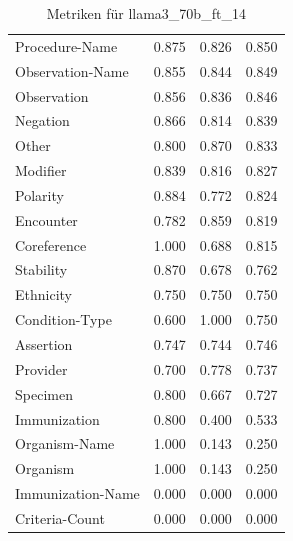 \begin{table}[htbp]
\begin{tabular}{p{5cm}ccc}
Procedure-Name & 0.875 & 0.826 & 0.850 \\
Observation-Name & 0.855 & 0.844 & 0.849 \\
Observation & 0.856 & 0.836 & 0.846 \\
Negation & 0.866 & 0.814 & 0.839 \\
Other & 0.800 & 0.870 & 0.833 \\
Modifier & 0.839 & 0.816 & 0.827 \\
Polarity & 0.884 & 0.772 & 0.824 \\
Encounter & 0.782 & 0.859 & 0.819 \\
Coreference & 1.000 & 0.688 & 0.815 \\
Stability & 0.870 & 0.678 & 0.762 \\
Ethnicity & 0.750 & 0.750 & 0.750 \\
Condition-Type & 0.600 & 1.000 & 0.750 \\
Assertion & 0.747 & 0.744 & 0.746 \\
Provider & 0.700 & 0.778 & 0.737 \\
Specimen & 0.800 & 0.667 & 0.727 \\
Immunization & 0.800 & 0.400 & 0.533 \\
Organism-Name & 1.000 & 0.143 & 0.250 \\
Organism & 1.000 & 0.143 & 0.250 \\
Immunization-Name & 0.000 & 0.000 & 0.000 \\
Criteria-Count & 0.000 & 0.000 & 0.000 \\
\bottomrule
\end{tabular}
\caption{Metriken für llama3_70b_ft_14}
\label{tab:metrics_llama3_70b_ft_14}
\end{table}